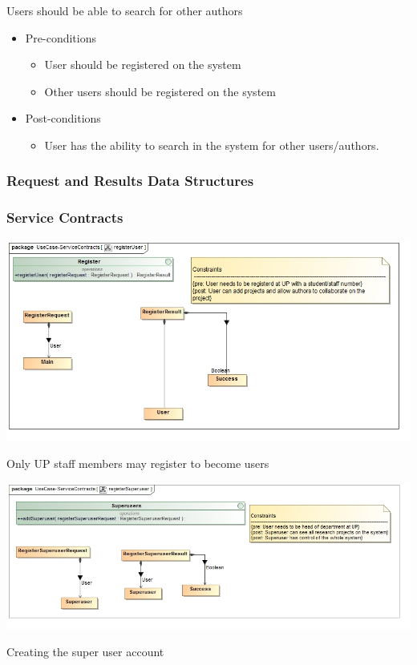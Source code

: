 \documentclass[a4paper,12pt]{report}
\begin{document}
	Users should be able to search for other authors
	\begin{itemize}
		\item Pre-conditions
			\begin{itemize}
				\item User should be registered on the system
				\item Other users should be registered on the system
			\end{itemize}
		\item Post-conditions
			\begin{itemize}
				\item User has the ability to search in the system for other users/authors.
			\end{itemize}
	\end{itemize}

\subsubsection{Request and Results Data Structures}
\subsubsection{Service Contracts}
\begin{flushleft}
	\includegraphics[scale=0.5]{./images/class__registerUser.jpg}
	\begin{center}
		Only UP staff members may register to become users
	\end{center}
\end{flushleft}

\begin{flushleft}
	\includegraphics[scale=0.5]{./images/class__registerSuperuser.jpg}
	\begin{center}
		Creating the super user account
	\end{center}
\end{flushleft}
\end{document}

